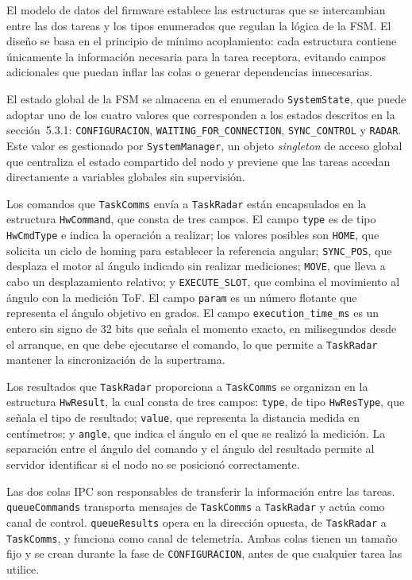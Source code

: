 El modelo de datos del firmware establece las estructuras que se intercambian entre las dos tareas y los tipos enumerados que regulan la lógica de la FSM. El diseño se basa en el principio de mínimo acoplamiento: cada estructura contiene únicamente la información necesaria para la tarea receptora, evitando campos adicionales que puedan inflar las colas o generar dependencias innecesarias.

El estado global de la FSM se almacena en el enumerado \texttt{SystemState}, que puede adoptar uno de los cuatro valores que corresponden a los estados descritos en la sección~5.3.1: \texttt{CONFIGURACION}, \texttt{WAITING\_FOR\_CONNECTION}, \texttt{SYNC\_CONTROL} y \texttt{RADAR}. Este valor es gestionado por \texttt{SystemManager}, un objeto \textit{singleton} de acceso global que centraliza el estado compartido del nodo y previene que las tareas accedan directamente a variables globales sin supervisión.

Los comandos que \texttt{TaskComms} envía a \texttt{TaskRadar} están encapsulados en la estructura \texttt{HwCommand}, que consta de tres campos. El campo \texttt{type} es de tipo \texttt{HwCmdType} e indica la operación a realizar; los valores posibles son \texttt{HOME}, que solicita un ciclo de homing para establecer la referencia angular; \texttt{SYNC\_POS}, que desplaza el motor al ángulo indicado sin realizar mediciones; \texttt{MOVE}, que lleva a cabo un desplazamiento relativo; y \texttt{EXECUTE\_SLOT}, que combina el movimiento al ángulo con la medición ToF. El campo \texttt{param} es un número flotante que representa el ángulo objetivo en grados. El campo \texttt{execution\_time\_ms} es un entero sin signo de 32 bits que señala el momento exacto, en milisegundos desde el arranque, en que debe ejecutarse el comando, lo que permite a \texttt{TaskRadar} mantener la sincronización de la supertrama.

Los resultados que \texttt{TaskRadar} proporciona a \texttt{TaskComms} se organizan en la estructura \texttt{HwResult}, la cual consta de tres campos: \texttt{type}, de tipo \texttt{HwResType}, que señala el tipo de resultado; \texttt{value}, que representa la distancia medida en centímetros; y \texttt{angle}, que indica el ángulo en el que se realizó la medición. La separación entre el ángulo del comando y el ángulo del resultado permite al servidor identificar si el nodo no se posicionó correctamente.

Las dos colas IPC son responsables de transferir la información entre las tareas. \texttt{queueCommands} transporta mensajes de \texttt{TaskComms} a \texttt{TaskRadar} y actúa como canal de control. \texttt{queueResults} opera en la dirección opuesta, de \texttt{TaskRadar} a \texttt{TaskComms}, y funciona como canal de telemetría. Ambas colas tienen un tamaño fijo y se crean durante la fase de \texttt{CONFIGURACION}, antes de que cualquier tarea las utilice.

